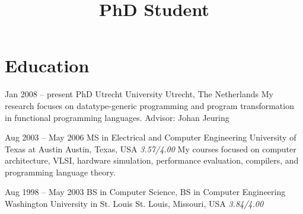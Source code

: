 \documentclass[11pt,a4paper,roman]{moderncv}
\title{PhD Student}
\begin{document}
\makecvtitle



\newcommand\seeabovedesc{(\textit{See description above.})}

\newcommand\utrecht{Utrecht, The Netherlands}
\newcommand\austin{Austin, Texas, USA}
\newcommand\stlouis{St. Louis, Missouri, USA}
\newcommand\chippewafalls{Chippewa Falls, Wisconsin, USA}
\newcommand\whitemarsh{White Marsh, Maryland, USA}
\newcommand\altamont{Altamont, Tennessee, USA}
\newcommand\chattanooga{Chattanooga, Tennessee, USA}
\newcommand\london{London, UK}
\newcommand\centurion{Centurion, South Africa}
\newcommand\portland{Portland, Oregon, USA}

\newcommand\uu{Utrecht University}
\newcommand\wustl{Washington University in St. Louis}
\newcommand\ut{University of Texas at Austin}



\newcommand\Cpp{C{}\texttt{++}\xspace}


\section{Education}

\cventry%
{Jan 2008 -- present}%
{PhD}%
{\uu}%
{\utrecht}%
{}%
{My research focuses on datatype-generic programming and program transformation
in functional programming languages.\newline{}%
Advisor: Johan Jeuring}

\cventry%
{Aug 2003 -- May 2006}%
{MS in Electrical and Computer Engineering}%
{University of Texas at Austin}%
{\austin}%
{\textit{3.57/4.00}}%
{My courses focused on computer architecture, VLSI, hardware simulation,
performance evaluation, compilers, and programming language theory.}

\cventry%
{Aug 1998 -- May 2003}%
{BS in Computer Science, BS in Computer Engineering}%
{\wustl}%
{\stlouis}%
{\textit{3.84/4.00}}%
{}

\end{document}
